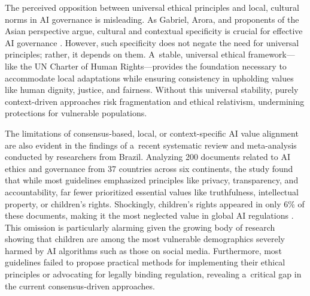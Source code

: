 \documentclass[%
  manuscript=article,
  year=2024,
  volume=77,
  doi=00000.000,
]{zfn}
\begin{document}
The perceived opposition between universal ethical principles and local, cultural norms in AI governance is misleading. As Gabriel, Arora, and proponents of the Asian perspective argue, cultural and contextual specificity is crucial for effective AI governance 
\parencites[][]{gabriel_artificial_2020}[][]{tam_incorporating_2023}[][]{arora_pessimism_2024}. %
 However, such specificity does not negate the need for universal principles; rather, it depends on them. A~stable, universal ethical framework---like the UN Charter of Human Rights---provides the foundation necessary to accommodate local adaptations while ensuring consistency in upholding values like human dignity, justice, and fairness. Without this universal stability, purely context-driven approaches risk fragmentation and ethical relativism, undermining protections for vulnerable populations.



The limitations of consensus-based, local, or context-specific AI value alignment are also evident in the findings of a~recent systematic review and meta-analysis conducted by researchers from Brazil. Analyzing 200 documents related to AI ethics and governance from 37 countries across six continents, the study found that while most guidelines emphasized principles like privacy, transparency, and accountability, far fewer prioritized essential values like truthfulness, intellectual property, or children's rights. Shockingly, children's rights appeared in only 6\% of these documents, making it the most neglected value in global AI regulations 
\parencite[][]{correa_worldwide_2023}. %
 This omission is particularly alarming given the growing body of research showing that children are among the most vulnerable demographics severely harmed by AI algorithms such as those on social media. Furthermore, most guidelines failed to propose practical methods for implementing their ethical principles or advocating for legally binding regulation, revealing a~critical gap in the current consensus-driven approaches.
\end{document}
